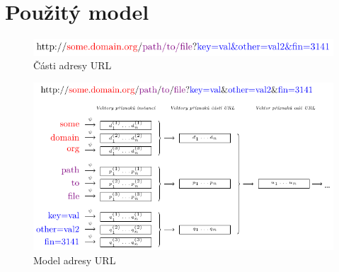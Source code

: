 \chapter{Použitý model}

\begin{figure}
	\caption{Části adresy URL}\label{url_parts}
	\centering
	\includegraphics{images/url/url.pdf}
\end{figure}

\begin{figure}
	\caption{Model adresy URL}\label{url_model}
	\centering
	\includegraphics{images/model/model.pdf}
\end{figure}

